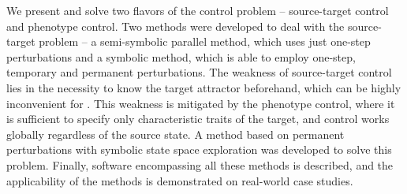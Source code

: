 We present and solve two flavors of the \PBN{} control problem -- source-target control and phenotype control. Two methods were developed to deal with the source-target problem -- a semi-symbolic parallel method, which uses just one-step perturbations and a symbolic method, which is able to employ one-step, temporary and permanent perturbations. The weakness of source-target control lies in the necessity to know the target attractor beforehand, which can be highly inconvenient for \PBN{}. This weakness is mitigated by the phenotype control, where it is sufficient to specify only characteristic traits of the target, and control works globally regardless of the source state. A method based on permanent perturbations with symbolic state space exploration was developed to solve this problem. Finally, software encompassing all these methods is described, and the applicability of the methods is demonstrated on real-world case studies.

\endgroup			

\vfill